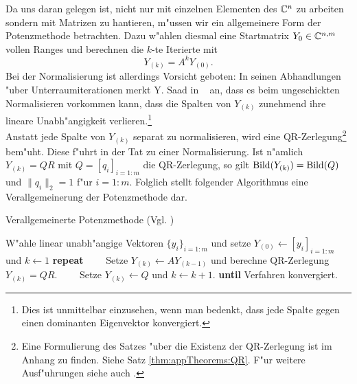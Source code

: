 
\newpage
Da uns daran gelegen ist, nicht nur mit einzelnen Elementen des $\mathbb{C}^n$ zu arbeiten sondern mit Matrizen zu hantieren, m"ussen wir ein allgemeinere Form der Potenzmethode betrachten. Dazu w"ahlen diesmal eine Startmatrix $Y_{0}\in\mathbb{C}^{n,m}$ vollen Ranges und berechnen die $k$-te Iterierte mit
\[
Y_{(k)} = A^k Y_{(0)}.
\]
Bei der Normalisierung ist allerdings Vorsicht geboten: In seinen Abhandlungen "uber Unterraumiterationen
merkt Y. Saad in ~\cite[Abschnitt 5.1]{saad} an,
dass es beim ungeschickten Normalisieren vorkommen kann, dass die Spalten von $Y_{(k)}$ zunehmend ihre lineare Unabh"angigkeit verlieren.\footnote{Dies ist unmittelbar einzusehen, wenn man bedenkt, dass jede Spalte gegen einen dominanten Eigenvektor konvergiert.}\\

Anstatt jede Spalte von $Y_{(k)}$ separat zu normalisieren, wird eine QR-Zerlegung\footnote{Eine Formulierung des Satzes "uber die Existenz der QR-Zerlegung ist im Anhang zu finden. Siehe Satz \ref{thm:appTheorems:QR}. F"ur weitere Ausf"uhrungen siehe auch \cite[55 ff.]{stewart}.}
bem"uht. Diese f"uhrt in der Tat zu einer Normalisierung. Ist n"amlich $Y_{(k)} = QR$ mit
$Q = [q_i]_{i=1:m}$ die QR-Zerlegung, so gilt $\operatorname{Bild}(Y_{(k)}) = \operatorname{Bild}(Q)$ und $\|q_i\|_2 = 1$ f"ur $i=1:m$. Folglich stellt folgender Algorithmus eine Verallgemeinerung der Potenzmethode dar.

\begin{algorithm}
\caption{Verallgemeinerte Potenzmethode (Vgl. \cite[Algorithmus 5.1, 115]{saad})}\label{alg:chap4:potenzverfahrenMatrix}
\begin{algorithmic}[1]
\State W"ahle linear unabh"angige Vektoren $\{y_i\}_{i=1:m}$ und setze $Y_{(0)}\gets[y_i]_{i=1:m}$ und $k\gets 1$
\State \textbf{repeat}
\State \ \ \ \ Setze $Y_{(k)} \gets AY_{(k-1)}$ und berechne QR-Zerlegung $Y_{(k)} = QR$.
\State \ \ \ \ Setze $Y_{(k)} \gets Q$ und $k\gets k+1$.
\State \textbf{until} Verfahren konvergiert.
\end{algorithmic}
\end{algorithm}

